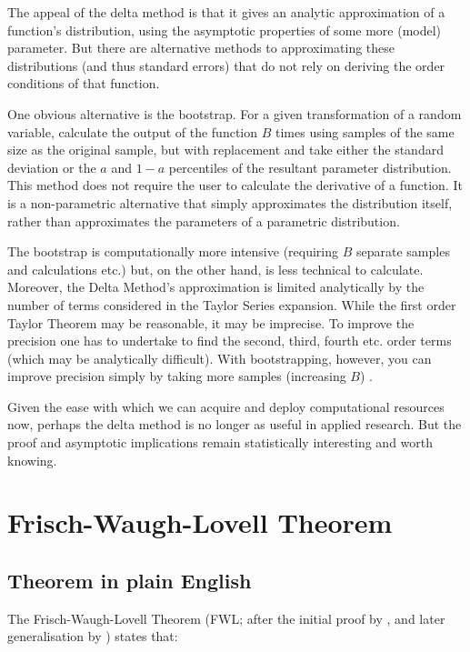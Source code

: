 \documentclass[
]{book}
\begin{document}
The appeal of the delta method is that it gives an analytic approximation of a function's distribution, using the asymptotic properties of some more (model) parameter. But there are alternative methods to approximating these distributions (and thus standard errors) that do not rely on deriving the order conditions of that function.

One obvious alternative is the bootstrap. For a given transformation of a random variable, calculate the output of the function \(B\) times using samples of the same size as the original sample, but with replacement and take either the standard deviation or the \(a\) and \(1-a\) percentiles of the resultant parameter distribution. This method does not require the user to calculate the derivative of a function. It is a non-parametric alternative that simply approximates the distribution itself, rather than approximates the parameters of a parametric distribution.

The bootstrap is computationally more intensive (requiring \(B\) separate samples and calculations etc.) but, on the other hand, is less technical to calculate. Moreover, the Delta Method's approximation is limited analytically by the number of terms considered in the Taylor Series expansion. While the first order Taylor Theorem may be reasonable, it may be imprecise. To improve the precision one has to undertake to find the second, third, fourth etc. order terms (which may be analytically difficult). With bootstrapping, however, you can improve precision simply by taking more samples (increasing \(B\)) \citep{KinTomWit00}.

Given the ease with which we can acquire and deploy computational resources now, perhaps the delta method is no longer as useful in applied research. But the proof and asymptotic implications remain statistically interesting and worth knowing.

\hypertarget{frisch}{%
\chapter{Frisch-Waugh-Lovell Theorem}\label{frisch}}

\hypertarget{theorem-in-plain-english}{%
\section{Theorem in plain English}\label{theorem-in-plain-english}}

The Frisch-Waugh-Lovell Theorem (FWL; after the initial proof by \citet{frisch1933partial}, and later generalisation by \citet{lovell1963seasonal}) states that:
\end{document}
